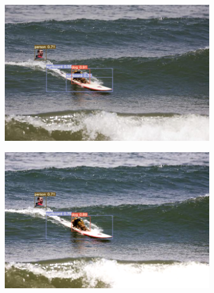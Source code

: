\documentclass{PHlab-thesis}
\begin{document}
\begin{figure}[H]
    \vspace{0.5cm}

    \begin{subfigure}{0.45\textwidth}
        \centering
        \includegraphics[width=\textwidth]{images/instances/original_image_2.png}
    \end{subfigure}
    \quad
    \begin{subfigure}{0.45\textwidth}
        \centering
        \includegraphics[width=\textwidth]{images/instances/adjusted_image_2.png}
    \end{subfigure}

    \vspace{0.5cm}


\end{figure}
\end{document}
